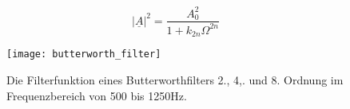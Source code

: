 \begin{equation} \label{eq:butterworth}
\left|\underline{A}\right|^2 = \frac{A_0^2}{1+ k_{2n} \Omega ^{2n}}
\end{equation}

\begin{figure}[h] 
  \begin{center}
    \texttt{[image: butterworth\_filter]}
    \caption[Butterworth-Filter]{Die Filterfunktion eines Butterworthfilters 2., 4,. und 8. Ordnung im Frequenzbereich von 500 bis 1250Hz. \label{fig:butterworth_filter}}
  \end{center}
\end{figure}